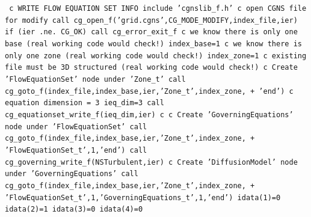 \documentclass[12pt]{article}
\begin{document}
{\tt
\noindent c   WRITE FLOW EQUATION SET INFO
\newline\indent      include 'cgnslib\_f.h'
\newline c   open CGNS file for modify
\newline\indent      call cg\_open\_f('grid.cgns',CG\_MODE\_MODIFY,index\_file,ier)
\newline\indent      if (ier .ne. CG\_OK) call cg\_error\_exit\_f
\newline c   we know there is only one base (real working code would check!)
\newline\indent      index\_base=1
\newline c   we know there is only one zone (real working code would check!)
\newline\indent      index\_zone=1
\newline c   existing file must be 3D structured (real working code would check!)
\newline c   Create 'FlowEquationSet' node under 'Zone\_t'
\newline\indent      call cg\_goto\_f(index\_file,index\_base,ier,'Zone\_t',index\_zone,
\newline + \indent   'end')
\newline c   equation dimension = 3
\newline\indent      ieq\_dim=3
\newline\indent      call cg\_equationset\_write\_f(ieq\_dim,ier)
\newline c
\newline c   Create 'GoverningEquations' node under 'FlowEquationSet'
\newline\indent      call cg\_goto\_f(index\_file,index\_base,ier,'Zone\_t',index\_zone,
\newline + \indent 'FlowEquationSet\_t',1,'end')
\newline\indent      call cg\_governing\_write\_f(NSTurbulent,ier)
\newline c   Create 'DiffusionModel' node under 'GoverningEquations'
\newline\indent      call cg\_goto\_f(index\_file,index\_base,ier,'Zone\_t',index\_zone,
\newline + \indent 'FlowEquationSet\_t',1,'GoverningEquations\_t',1,'end')
\newline\indent      idata(1)=0
\newline\indent      idata(2)=1
\newline\indent      idata(3)=0
\newline\indent      idata(4)=0
}
\end{document}
